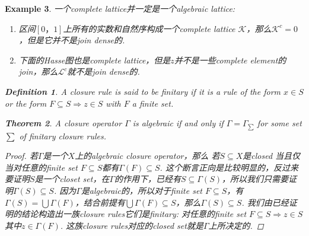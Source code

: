 \documentclass{article}
\newtheorem{theorem}{Theorem}[section]
\newtheorem{example}[theorem]{Example}
\newtheorem{definition}[theorem]{Definition}
\newcommand\lattice{\mathcal{L}}
\begin{document}
\begin{example}
\rm 一个complete lattice并一定是一个algebraic lattice:
\begin{enumerate}
	\item 区间$[0，1]$上所有的实数和自然序构成一个complete lattice $\mathcal{K}$，那么$\mathcal{K}^c = {0}$，但是它并不是join dense的. 
	\item 下面的Hasse图也是complete lattice，但是$z$并不是一些complete element的join，那么$\lattice ^c$就不是join dense的.
	\begin{center}
	\end{center}
\end{enumerate}

\begin{definition}
\rm A closure rule is said to be {\color{red} finitary} if it is a rule of the form $x \in S$ or the form $F \subseteq S \Rightarrow  z \in S$ with $F$ a finite set.
\end{definition}

\begin{theorem}
\rm A closure operator $\Gamma$ is algebraic if and only if $\Gamma = \Gamma_{\sum}$ for some set $\sum$ of finitary closure rules.
\end{theorem}

\begin{proof}
若$\Gamma$是一个$X$上的algebraic closure operator，那么{\color{red} 若$S \subseteq X$是closed 当且仅当对任意的finite set $F \subseteq S$都有$\Gamma(F) \subseteq S$}. 这个断言正向是比较明显的，反过来要证明$S$是一个closet set，在$\Gamma$的作用下，已经有$S \subseteq \Gamma(S)$，所以我们只需要证明$\Gamma(S) \subseteq S$. 因为$\Gamma$是algebraic的，所以对于finite set $F \subseteq S$，有$\Gamma(S) = \bigcup \Gamma(F)$，结合前提有$\bigcup \Gamma(F) \subseteq S$，那么$\Gamma(S) \subseteq S$. 我们由已经证明的结论构造出一族closure rules它们是finitary: 对任意的finite set $F \subseteq S \Rightarrow z \in S$其中$z \in \Gamma(F)$. 这族closure rules对应的closed set就是$\Gamma$上所决定的. 


\end{proof}
\end{example}
\end{document}
